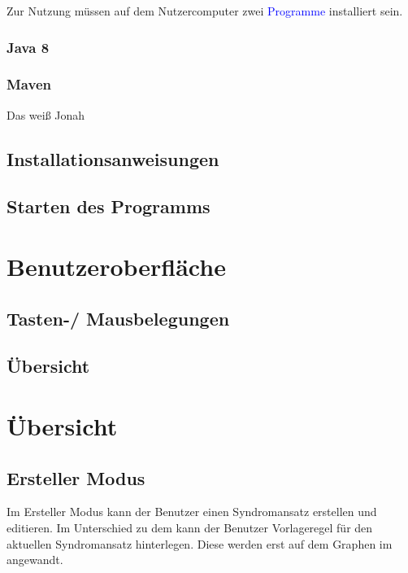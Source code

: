 \documentclass[enabledeprecatedfontcommands,fontsize=11pt,paper=a4,twoside]{scrartcl}
\newcommand*{\blue}{\textcolor{blue}}
\begin{document}
	Zur Nutzung müssen auf dem Nutzercomputer zwei \blue{Programme} installiert sein.

	\subsubsection{Java 8}
	\subsubsection{Maven}
	Das weiß Jonah

	\subsection{Installationsanweisungen}
	\subsection{Starten des Programms}

\newpage	
\section{Benutzeroberfläche}
	\subsection{Tasten-/ Mausbelegungen}
	\subsection{Übersicht}
	
\newpage	
\section{Übersicht} \label{sec:uebersicht}
\subsection{Ersteller Modus}
Im Ersteller Modus kann der Benutzer einen Syndromansatz erstellen und editieren. Im Unterschied zu dem  kann der Benutzer Vorlageregel für den aktuellen Syndromansatz hinterlegen. Diese werden erst auf dem Graphen im  angewandt. 
\end{document}
